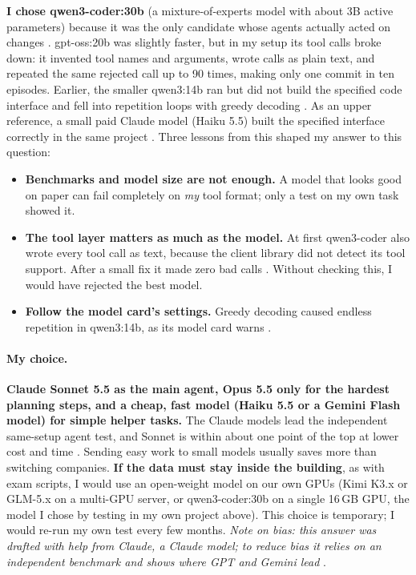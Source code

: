 \textbf{I chose qwen3-coder:30b} (a mixture-of-experts model with about 3B active parameters) because it was the only
candidate whose agents actually acted on changes \citep{agentic0049}. gpt-oss:20b was slightly faster, but in my setup its
tool calls broke down: it invented tool names and arguments, wrote calls as plain text, and repeated the same rejected call
up to 90 times, making only one commit in ten episodes. Earlier, the smaller qwen3:14b ran but did not build the specified
code interface and fell into repetition loops with greedy decoding \citep{agentic0038}. As an upper reference, a small paid
Claude model (Haiku 5.5) built the specified interface correctly in the same project \citep{agenticlog}. Three lessons from
this shaped my answer to this question:
\begin{itemize}
  \item \textbf{Benchmarks and model size are not enough.} A model that looks good on paper can fail completely on
        \emph{my} tool format; only a test on my own task showed it.
  \item \textbf{The tool layer matters as much as the model.} At first qwen3-coder also wrote every tool call as text,
        because the client library did not detect its tool support. After a small fix it made zero bad calls
        \citep{agentic0046}. Without checking this, I would have rejected the best model.
  \item \textbf{Follow the model card's settings.} Greedy decoding caused endless repetition in qwen3:14b, as its model card
        warns \citep{agentic0038}.
\end{itemize}

\paragraph{My choice.} \textbf{Claude Sonnet 5.5 as the main agent, Opus 5.5 only for the hardest planning steps, and a
cheap, fast model (Haiku 5.5 or a Gemini Flash model) for simple helper tasks.} The Claude models lead the independent
same-setup agent test, and Sonnet is within about one point of the top at lower cost and time \citep{valstb4}. Sending
easy work to small models usually saves more than switching companies. \textbf{If the data must stay inside the building},
as with exam scripts, I would use an open-weight model on our own GPUs (Kimi K3.x or GLM-5.x on a multi-GPU server, or
qwen3-coder:30b on a single 16\,GB GPU, the model I chose by testing in my own project above). This choice is temporary; I would re-run my own test every few months.
\emph{Note on bias: this answer was drafted with help from Claude, a Claude model; to reduce bias it relies on an
independent benchmark and shows where GPT and Gemini lead} .

